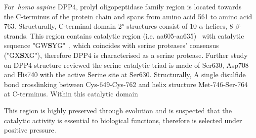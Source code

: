 For~\textit{homo sapine} DPP4, prolyl oligopeptidase family region is located towards the C-terminus of the protein chain and spans from amino acid 561 to amino acid 763. Structurally, C-terminal domain 2$^{o}$ structures consist of 10 $\alpha$-helices, 8 $\beta$-strands. This region contains catalytic region (i.e. aa605-aa635)~\cite{Rawlings1991,Barrett1992,Polgár1992,Rawlings1994} with catalytic sequence "GW\textbf{S}YG"~\cite{Ogata_1992}, which coincides with serine proteases' consensus ("GX\textbf{S}XG"), therefore DPP4 is characterised as a serine protease. Further study on DPP4 structure reviewed the serine catalytic triad is made of Ser630, Asp708 and His740 with the active Serine site at Ser630. Structurally, A single disulfide bond crosslinking between Cys-649-Cys-762 and helix structure Met-746-Ser-764 at C-terminus. Within this catalytic domain
\par
This region is highly preserved through evolution and is suspected that the catalytic activity is essential to biological functions, therefore is selected under positive pressure. 